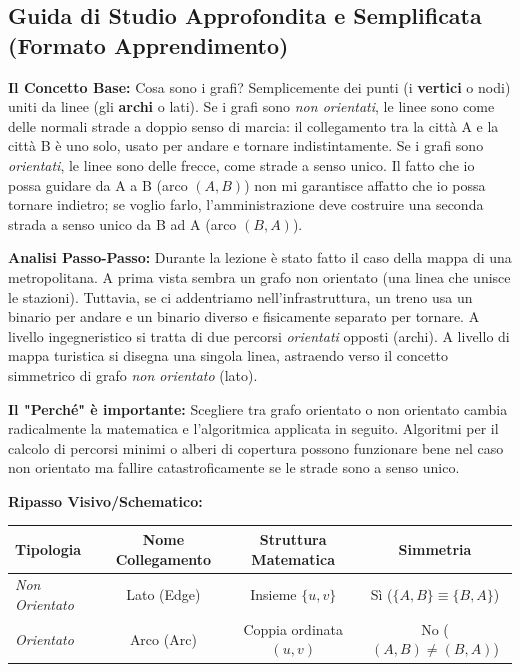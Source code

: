 \documentclass[a4paper, 11pt]{report}
\begin{document}
\vspace{0.5cm}
\subsection*{Guida di Studio Approfondita e Semplificata (Formato Apprendimento)}



\textbf{Il Concetto Base:}
Cosa sono i grafi? Semplicemente dei punti (i \textbf{vertici} o nodi) uniti da linee (gli \textbf{archi} o lati).
Se i grafi sono \textit{non orientati}, le linee sono come delle normali strade a doppio senso di marcia: il collegamento tra la città A e la città B è uno solo, usato per andare e tornare indistintamente.
Se i grafi sono \textit{orientati}, le linee sono delle frecce, come strade a senso unico. Il fatto che io possa guidare da A a B (arco $(A,B)$) non mi garantisce affatto che io possa tornare indietro; se voglio farlo, l'amministrazione deve costruire una seconda strada a senso unico da B ad A (arco $(B,A)$).

\textbf{Analisi Passo-Passo:}
Durante la lezione è stato fatto il caso della mappa di una metropolitana. A prima vista sembra un grafo non orientato (una linea che unisce le stazioni). Tuttavia, se ci addentriamo nell'infrastruttura, un treno usa un binario per andare e un binario diverso e fisicamente separato per tornare. A livello ingegneristico si tratta di due percorsi \textit{orientati} opposti (archi). A livello di mappa turistica si disegna una singola linea, astraendo verso il concetto simmetrico di grafo \textit{non orientato} (lato).

\textbf{Il "Perché" è importante:}
Scegliere tra grafo orientato o non orientato cambia radicalmente la matematica e l'algoritmica applicata in seguito. Algoritmi per il calcolo di percorsi minimi o alberi di copertura possono funzionare bene nel caso non orientato ma fallire catastroficamente se le strade sono a senso unico.

\textbf{Ripasso Visivo/Schematico:}
\begin{center}
\begin{tabular}{|l|c|c|c|}
\hline
\textbf{Tipologia} & \textbf{Nome Collegamento} & \textbf{Struttura Matematica} & \textbf{Simmetria} \\
\hline
\textit{Non Orientato} & Lato (Edge) & Insieme $\{u, v\}$ & Sì ($\{A,B\} \equiv \{B,A\}$) \\
\hline
\textit{Orientato} & Arco (Arc) & Coppia ordinata $(u, v)$ & No ($(A,B) \neq (B,A)$) \\
\hline
\end{tabular}
\end{center}
\end{document}
